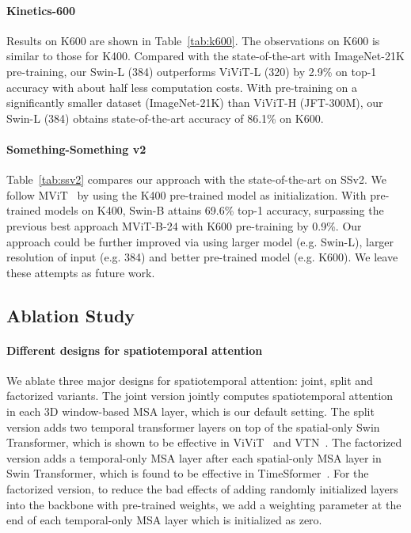\documentclass{article}
\begin{document}
\paragraph{Kinetics-600} Results on K600 are shown in Table~\ref{tab:k600}. The observations on K600 is similar to those for K400. Compared with the state-of-the-art with ImageNet-21K pre-training, our Swin-L (384) outperforms ViViT-L (320) by 2.9\% on top-1 accuracy with about half less computation costs.
With pre-training on a significantly smaller dataset (ImageNet-21K) than ViViT-H (JFT-300M), our Swin-L (384) obtains state-of-the-art accuracy of 86.1\% on K600.

\paragraph{Something-Something v2} Table~\ref{tab:ssv2} compares our approach with the state-of-the-art on SSv2. We follow MViT~\cite{mvit2021} by using the K400 pre-trained model as initialization. With pre-trained models on K400, Swin-B attains 69.6\% top-1 accuracy, surpassing the previous best approach MViT-B-24 with K600 pre-training by 0.9\%. Our approach could be further improved via using larger model (e.g. Swin-L), larger resolution of input (e.g. 384) and better pre-trained model (e.g. K600). We leave these attempts as future work.

\subsection{Ablation Study}
\paragraph{Different designs for spatiotemporal attention} We ablate three major designs for spatiotemporal attention: joint, split and factorized variants. The joint version jointly computes spatiotemporal attention in each 3D window-based MSA layer, which is our default setting. The split version adds two temporal transformer layers on top of the spatial-only Swin Transformer, which is shown to be effective in ViViT~\cite{arnab2021vivit} and VTN~\cite{neimark2021VTN}. The factorized version adds a temporal-only MSA layer after each spatial-only MSA layer in Swin Transformer, which is found to be effective in TimeSformer~\cite{timesformer2021}.
For the factorized version, to reduce the bad effects of adding randomly initialized layers into the backbone with pre-trained weights, we add a weighting parameter at the end of each temporal-only MSA layer which is initialized as zero.
\end{document}
